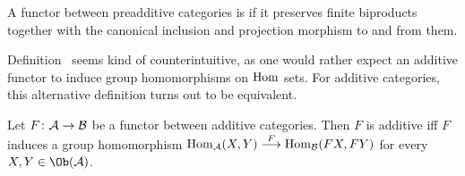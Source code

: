 \documentclass[a4paper,parskip=half,numbers=enddot, DIV=12]{scrreprt}
\begin{document}
\begin{defi}
	A functor between preadditive categories is  if it preserves finite biproducts together with the canonical inclusion and projection morphism to and from them.
\end{defi}
\begin{rem*}
	Definition~ seems kind of counterintuitive, as one would rather expect an additive functor to induce group homomorphisms on $\operatorname{Hom}$ sets. For additive categories, this alternative definition turns out to be equivalent.
\end{rem*}
\begin{prop}
	Let $F\colon \Aa\morphism\Bb$ be a functor between additive categories. Then $F$ is additive iff $F$ induces a group homomorphism $\Hom_\Aa(X,Y)\morphism[F]\Hom_\Bb(FX,FY)$ for every $X,Y\in\Ob(\Aa)$.
\end{prop}
\end{document}
